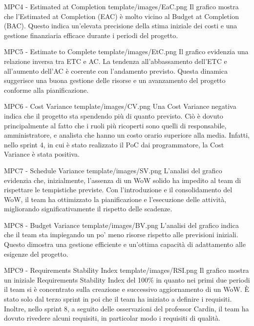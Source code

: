 \Met
{ %
    MPC4 - Estimated at Completion
}
{ %
    template/images/EaC.png
}
{ %
    Il grafico mostra che l'Estimated at Completion (EAC) è molto vicino al Budget at Completion (BAC).
    Questo indica un'elevata precisione della stima iniziale dei costi e una gestione finanziaria efficace durante i periodi del progetto. 
}

\Met
{ %
    MPC5 - Estimate to Complete
}
{ %
    template/images/EtC.png
}
{ %
    Il grafico evidenzia una relazione inversa tra ETC e AC.
    La tendenza all'abbassamento dell'ETC e all'aumento dell'AC è coerente con l'andamento previsto. 
    Questa dinamica suggerisce una buona gestione delle risorse e un avanzamento del progetto conforme alla pianificazione.
}

\Met
{ %
    MPC6 - Cost Variance
}
{ %
    template/images/CV.png
}
{ %
    Una Cost Variance negativa indica che il progetto sta spendendo più di quanto previsto. 
    Ciò è dovuto principalmente al fatto che i ruoli più ricoperti sono quelli di responsabile, 
    amministratore, e analista che hanno un costo orario superiore alla media.
    Infatti, nello sprint 4, in cui è stato realizzato il PoC dai programmatore, la Cost Variance è stata positiva.
}

\Met
{ %
    MPC7 - Schedule Variance
}
{ %
    template/images/SV.png
}
{ %
    L'analisi del grafico evidenzia che, inizialmente, l'assenza di un WoW solido ha impedito al team di rispettare le tempistiche previste. 
    Con l'introduzione e il consolidamento del WoW, il team ha ottimizzato la pianificazione e l'esecuzione delle attività, migliorando significativamente il rispetto delle scadenze.
}

\Met
{ %
    MPC8 - Budget Variance
}
{ %
    template/images/BV.png
}
{ %
    L'analisi del grafico indica che il team sta impiegando un po' meno risorse rispetto alle previsioni iniziali.
    Questo dimostra una gestione efficiente e un'ottima capacità di adattamento alle esigenze del progetto.
}

\Met
{ %
    MPC9 - Requirements Stability Index
}
{ %
    template/images/RSI.png
}
{ %
    Il grafico mostra un iniziale Requirements Stability Index del 100\% in quanto nei primi due periodi il team si è
    concentrato sulla creazione e successivo aggiornamento di un WoW. 
    È stato solo dal terzo sprint in poi che il team ha iniziato a definire i requisiti.
    Inoltre, nello sprint 8, a seguito delle osservazioni del professor Cardin, il team ha dovuto rivedere alcuni requisiti,
    in particolar modo i requisiti di qualità.
}

